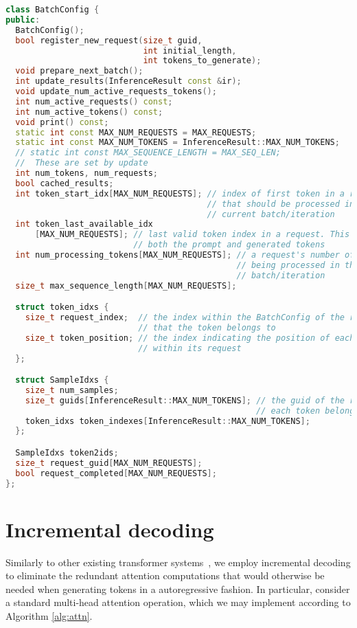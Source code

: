 \begin{lstlisting}[language=C++, caption=BatchConfig, breaklines=true, basicstyle=\footnotesize, frame=single, label=batchConfigListing]
class BatchConfig {
public:
  BatchConfig();
  bool register_new_request(size_t guid,
                            int initial_length,
                            int tokens_to_generate);
  void prepare_next_batch();
  int update_results(InferenceResult const &ir);
  void update_num_active_requests_tokens();
  int num_active_requests() const;
  int num_active_tokens() const;
  void print() const;
  static int const MAX_NUM_REQUESTS = MAX_REQUESTS;
  static int const MAX_NUM_TOKENS = InferenceResult::MAX_NUM_TOKENS;
  // static int const MAX_SEQUENCE_LENGTH = MAX_SEQ_LEN;
  //  These are set by update
  int num_tokens, num_requests;
  bool cached_results;
  int token_start_idx[MAX_NUM_REQUESTS]; // index of first token in a request
                                         // that should be processed in the
                                         // current batch/iteration
  int token_last_available_idx
      [MAX_NUM_REQUESTS]; // last valid token index in a request. This includes
                          // both the prompt and generated tokens
  int num_processing_tokens[MAX_NUM_REQUESTS]; // a request's number of tokens
                                               // being processed in the current
                                               // batch/iteration
  size_t max_sequence_length[MAX_NUM_REQUESTS];

  struct token_idxs {
    size_t request_index;  // the index within the BatchConfig of the request
                           // that the token belongs to
    size_t token_position; // the index indicating the position of each token
                           // within its request
  };

  struct SampleIdxs {
    size_t num_samples;
    size_t guids[InferenceResult::MAX_NUM_TOKENS]; // the guid of the request
                                                   // each token belongs to
    token_idxs token_indexes[InferenceResult::MAX_NUM_TOKENS];
  };

  SampleIdxs token2ids;
  size_t request_guid[MAX_NUM_REQUESTS];
  bool request_completed[MAX_NUM_REQUESTS];
};
\end{lstlisting}

\section{Incremental decoding}
Similarly to other existing transformer systems~\cite{fairseq, orca}, we employ incremental decoding to eliminate the redundant attention computations that would otherwise be needed when generating tokens in a autoregressive fashion. In particular, consider a standard multi-head attention operation, which we may implement according to Algorithm \ref{alg:attn}.

